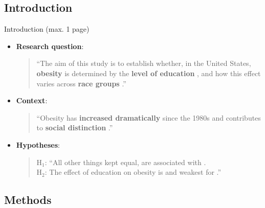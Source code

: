 \documentclass[t]{beamer}
\begin{document}
	\subsection{Introduction}
	
	\begin{frame}[t]{Introduction (max. 1 page)}

		\begin{itemize}
			\item \textbf{Research question}: \\
			\begin{quote}``The aim of this study is to establish whether, in the United States, \textbf{obesity}  is determined by the \textbf{level of education} , and how this effect varies across \textbf{race groups} .''\end{quote}
			
			
			\item \textbf{Context}: \\
			\begin{quote}``Obesity has \textbf{increased dramatically} since the 1980s \red{[magnitude]} and contributes to \textbf{social distinction} \red{[theory]}.''\end{quote}
			
			\item \textbf{Hypotheses}: \\
			\begin{quote}
				$\mathrm{H_1}$: ``All other things kept equal,  are associated with .\\
				
				$\mathrm{H_2}$: The effect of education on obesity is  and weakest for .''\end{quote}
		\end{itemize}
		
	\end{frame}
	
	\subsection{Methods}
\end{document}
